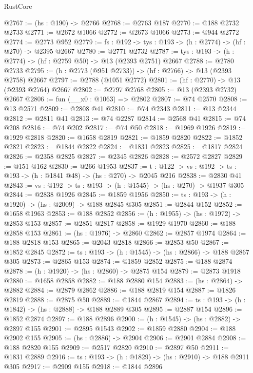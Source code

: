 \begin{lexlean}{RustCore}
\begin{coremodule}
@2767 := (hs : @190) -> @2766
@2768 := @2763 @187
@2770 := @188 @2732 @2733
@2771 := @2672 @1066
@2772 := @2673 @1066
@2773 := @944 @2772
@2774 := @2773 @952
@2779 := {fs : @192} -> {tys : @193} -> (h : @2774) -> (hf : @270) -> @2395 @2667
@2780 := @2771 @2732
@2787 := {tys : @193} -> (h : @2774) -> (hf : @2759 @50) -> @13 (@2393 @2751) @2667
@2788 := @2780 @2733
@2795 := (h : @2773 (@951 @2733)) -> (hf : @2766) -> @13 (@2393 @2758) @2667
@2797 := @2788 (@1051 @2772)
@2801 := (hf : @2770) -> @13 (@2393 @2764) @2667
@2802 := @2797 @2768
@2805 := @13 (@2393 @2732) @2667
@2806 := fun (__x0 : @1063) => @2802
@2807 := @74 @2570
@2808 := @13 @2571
@2809 := @2808 @41
@2810 := @74 @2343
@2811 := @13 @2344
@2812 := @2811 @41
@2813 := @74 @2287
@2814 := @2568 @41
@2815 := @74 @208
@2816 := @74 @202
@2817 := @74 @50
@2818 := @1969 @1926
@2819 := @1929 @2818
@2820 := @1658 @2819
@2821 := @1859 @2820
@2822 := @1852 @2821
@2823 := @1844 @2822
@2824 := @1831 @2823
@2825 := @1817 @2824
@2826 := @2358 @2825
@2827 := @2345 @2826
@2828 := @2572 @2827
@2829 := @151 @162
@2830 := @266 @1953
@2837 := {t : @122} -> {vs : @192} -> {ts : @193} -> (h : @1841 @48) -> (hs : @270) -> @2045 @216
@2838 := @2830 @41
@2843 := {vs : @192} -> {ts : @193} -> (h : @1545) -> (hs : @270) -> @1937 @305
@2844 := @2838 @1926
@2845 := @1859 @1956
@2850 := {ts : @193} -> (h : @1920) -> (hs : @2009) -> @188 @2845 @305
@2851 := @2844 @152
@2852 := @1658 @1963
@2853 := @188 @2852
@2856 := (h : @1955) -> (hs : @1972) -> @2853 @153
@2857 := @2851 @2817
@2858 := @1929 @1970
@2860 := @188 @2858 @153
@2861 := (hs : @1976) -> @2860
@2862 := @2857 @1974
@2864 := @188 @2818 @153
@2865 := @2043 @2818
@2866 := @2853 @50
@2867 := @1852 @2845
@2872 := {ts : @193} -> (h : @1545) -> (hs : @2866) -> @188 @2867 @305
@2873 := @2865 @153
@2874 := @1859 @2852
@2875 := @188 @2874
@2878 := (h : @1920) -> (hs : @2860) -> @2875 @154
@2879 := @2873 @1918
@2880 := @1658 @2858
@2882 := @188 @2880 @154
@2883 := (hs : @2864) -> @2882
@2884 := @2879 @2862
@2886 := @188 @2819 @154
@2887 := @1826 @2819
@2888 := @2875 @50
@2889 := @1844 @2867
@2894 := {ts : @193} -> (h : @1842) -> (hs : @2888) -> @188 @2889 @305
@2895 := @2887 @154
@2896 := @1852 @2874
@2897 := @188 @2896
@2900 := (h : @1545) -> (hs : @2882) -> @2897 @155
@2901 := @2895 @1543
@2902 := @1859 @2880
@2904 := @188 @2902 @155
@2905 := (hs : @2886) -> @2904
@2906 := @2901 @2884
@2908 := @188 @2820 @155
@2909 := @2517 @2820
@2910 := @2897 @50
@2911 := @1831 @2889
@2916 := {ts : @193} -> (h : @1829) -> (hs : @2910) -> @188 @2911 @305
@2917 := @2909 @155
@2918 := @1844 @2896

\end{coremodule}
\end{lexlean}
